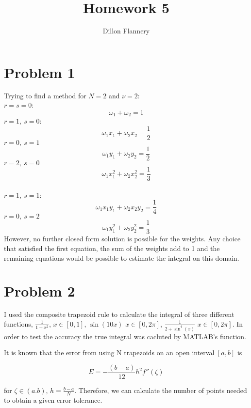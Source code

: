 \documentclass[]{article}
\title{Homework 5}
\author{Dillon Flannery}
\begin{document}
\maketitle

\section*{Problem 1}
Trying to find a method for $ N = 2 $ and $ \nu = 2 $: \\
$ r = s = 0 $: \\
$$ \omega_1 + \omega_2  = 1$$ 
$ r = 1, \ s =0 $: \\
$$ \omega_1x_1 + \omega_2x_2 = \frac{1}{2} $$ 
$ r = 0, \ s = 1 $
\[ \omega_1y_1 + \omega_2y_2 = \frac{1}{2} \]
$ r =2, \ s=0 $ \\
$$ \omega_1x_1^2  + \omega_2 x_2 ^2 = \frac{1}{3}$$ \\
$ r = 1, \ s = 1 $: \\
$$ \omega_1x_1y_1 + \omega_2x_2y_2 = \frac{1}{4} $$ 
$ r = 0, \ s= 2 $ \\
$$ \omega_1y_1^2 + \omega_2y_2^2 = \frac{1}{3} $$
However, no further closed form solution is possible for the weights. Any choice that satisfied the first equation, the sum of the weights add to 1 and the remaining equations would be possible to estimate the integral on this domain. 


\section*{Problem 2} 
I used the composite trapezoid rule to calculate the integral of three different functions, $ \frac{1}{1+x^2} $, $ x \in [0,1] $, $ \sin(10x) $ $ x \in [0, 2\pi] $, $ \frac{1}{2 + \sin^4(x)} $ $ x \in [0, 2\pi]  $. In order to test the accuracy the true integral was cacluted by MATLAB's  function.  

It is known that the error from using N trapezoids on an open interval $ [a,b] $ is 

\[
E = -\frac{(b-a)}{12} h^2 f''(\zeta)
\]

 for $ \zeta \in (a.b) $, $ h = \frac{b-a}{N} $. Therefore, we can calculate the number of points needed to obtain a given error tolerance. 
\end{document}
